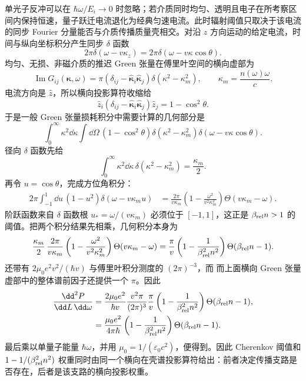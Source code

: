 \begin{exbox}[Cherenkov 辐射]
单光子反冲可以在 $\hbar\omega/E_i\to0$ 时忽略；若介质同时均匀、透明且电子在所考察区间内保持恒速，量子跃迁电流退化为经典匀速电流。此时辐射阈值只取决于该电流的同步 Fourier 分量能否与介质传播质量壳相交。对沿 $z$ 方向运动的给定电流，时间与纵向坐标积分产生同步 $\delta$ 函数
\begin{equation*}
2\pi\delta(\omega-v\kappa_z)
=2\pi\delta(\omega-v\kappa\cos\theta).
\end{equation*}
均匀、无损、非磁介质的推迟 Green 张量在傅里叶空间的横向虚部为
\begin{equation*}
\operatorname{Im}G_{ij}(\boldsymbol\kappa,\omega)
=\pi\left(\delta_{ij}-\widehat{\boldsymbol\kappa}_i\widehat{\boldsymbol\kappa}_j\right)
\delta(\kappa^2-\kappa_m^2),
\qquad
\kappa_m=\frac{n(\omega)\omega}{c}.
\end{equation*}
电流方向是 $\hat z$，所以横向投影算符收缩给
\begin{equation*}
\hat z_i(\delta_{ij}-\widehat{\boldsymbol\kappa}_i\widehat{\boldsymbol\kappa}_j)\hat z_j
=1-\cos^2\theta.
\end{equation*}
于是一般 Green 张量损耗积分中需要计算的几何部分是
\begin{equation*}
\int_0^\infty \kappa^2\dd\kappa\int\dd\Omega\,
(1-\cos^2\theta)
\delta(\kappa^2-\kappa_m^2)
\delta(\omega-v\kappa\cos\theta).
\end{equation*}
径向 $\delta$ 函数先给
\begin{equation*}
\int_0^\infty \kappa^2\dd\kappa\,\delta(\kappa^2-\kappa_m^2)
=\frac{\kappa_m}{2}.
\end{equation*}
再令 $u=\cos\theta$，完成方位角积分：
\begin{align*}
2\pi\int_{-1}^{1}\dd u\,(1-u^2)
\delta(\omega-v\kappa_m u)
&=\frac{2\pi}{v\kappa_m}
\left(1-\frac{\omega^2}{v^2\kappa_m^2}\right)
\Theta(v\kappa_m-\omega).
\end{align*}
阶跃函数来自 $\delta$ 函数根
$u_*=\omega/(v\kappa_m)$ 必须位于 $[-1,1]$，这正是 $\beta_{\rm rel}n>1$ 的阈值。把两个积分结果先相乘，几何积分本身为
\begin{equation*}
\frac{\kappa_m}{2}\,
\frac{2\pi}{v\kappa_m}
\left(1-\frac{\omega^2}{v^2\kappa_m^2}\right)
\Theta(v\kappa_m-\omega)
=\frac{\pi}{v}
\left(1-\frac1{\beta_{\rm rel}^2n^2}\right)
\Theta(\beta_{\rm rel}n-1).
\end{equation*}
 还带有
$2\mu_0e^2v^2/(\hbar v)$ 与傅里叶积分测度的 $(2\pi)^{-3}$，而
而上面横向 Green 张量虚部中的整体谱前因子还提供一个 $\pi$。因此
\begin{align*}
\frac{\dd^2 P}{\dd L\,\dd\omega}
&=\frac{2\mu_0e^2}{\hbar v}
\frac{v^2\pi}{(2\pi)^3}
\frac{\pi}{v}
\left(1-\frac1{\beta_{\rm rel}^2n^2}\right)
\Theta(\beta_{\rm rel}n-1),\\
&=\frac{\mu_0e^2}{4\pi\hbar}
\left(1-\frac1{\beta_{\rm rel}^2n^2}\right)
\Theta(\beta_{\rm rel}n-1).
\end{align*}
最后乘以单量子能量 $\hbar\omega$，并用
$\mu_0=1/(\varepsilon_0c^2)$，便得到。因此 Cherenkov 阈值和 $1-1/(\beta_{\rm rel}^2n^2)$ 权重同时由同一个横向在壳谱投影算符给出：前者决定传播支路是否存在，后者是该支路的横向投影权重。
\end{exbox}

